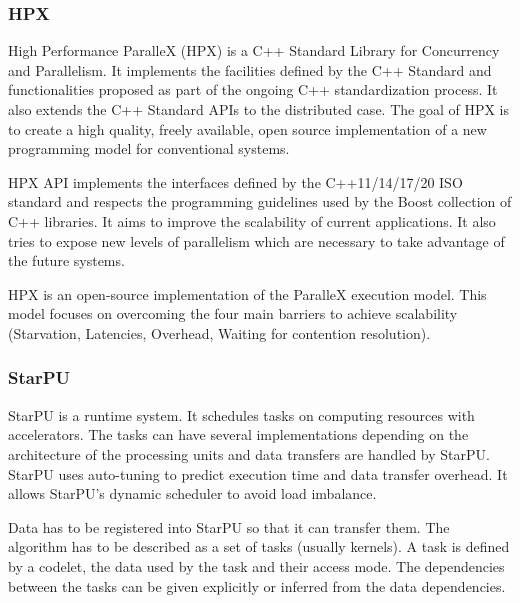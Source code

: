 \subsubsection{HPX}
High Performance ParalleX (HPX) \cite{KHASF2014} is a C++ Standard Library for Concurrency and Parallelism.
It implements the facilities defined by the C++ Standard and functionalities proposed as part of the ongoing C++ standardization process.
It also extends the C++ Standard APIs to the distributed case.
The goal of HPX is to create a high quality, freely available, open source implementation of a new programming model for conventional systems.

HPX API implements the interfaces defined by the C++11/14/17/20 ISO standard and respects the programming guidelines used by the Boost collection of C++ libraries.
It aims to improve the scalability of current applications.
It also tries to expose new levels of parallelism which are necessary to take advantage of the future systems.

HPX is an open-source implementation of the ParalleX execution model.
This model focuses on overcoming the four main barriers to achieve scalability (Starvation, Latencies, Overhead, Waiting for contention resolution).

\subsubsection{StarPU}
StarPU \cite{AuTNW2011} is a runtime system.
It schedules tasks on computing resources with accelerators.
The tasks can have several implementations depending on the architecture of the processing units and data transfers are handled by StarPU.
StarPU uses auto-tuning to predict execution time and data transfer overhead.
It allows StarPU's dynamic scheduler to avoid load imbalance.

Data has to be registered into StarPU so that it can transfer them.
The algorithm has to be described as a set of tasks (usually kernels).
A task is defined by a codelet, the data used by the task and their access mode.
The dependencies between the tasks can be given explicitly or inferred from the data dependencies.

